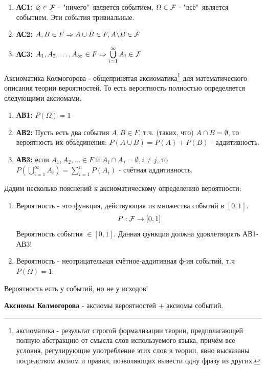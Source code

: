 \begin{axioms}\leavevmode \vspace*{-\bigskipamount}\vspace*{-\medskipamount}
	\begin{enumerate}
		\item \textbf{АС1:} $\varnothing \in {\mathcal F}$ - "ничего"\ является событием, $\Omega \in {\mathcal F}$ - "всё"\ является событием. Эти события тривиальные.
		\item \textbf{АС2:} $A, B \in F \Rightarrow A \cup B \in F, A \backslash B \in {\mathcal F}$
		\item \textbf{АС3:} $A_1, A_2, \dots, A_\infty \in F \Rightarrow \bigcup\limits_{i=1}^{\infty} A_i \in {\mathcal F}$
	\end{enumerate}
\end{axioms}

\begin{definition}
	Аксиоматика Колмогорова - общепринятая аксиоматика\footnote{аксиоматика - результат строгой формализации теории, предполагающей полную абстракцию от смысла слов используемого языка, причём все условия, регулирующие употребление этих слов в теории, явно высказаны посредством аксиом и правил, позволяющих вывести одну фразу из других.} для математического описания теории вероятностей. То есть вероятность полностью определяется следующими аксиомами.
	\begin{axioms}[вероятности]\leavevmode \vspace*{-\bigskipamount}\vspace*{-\medskipamount}
		\begin{enumerate}
			\item \textbf{АВ1:} $P(\Omega) = 1$
			\item \textbf{АВ2:} Пусть есть два события $A, B \in F$, т.ч. (таких, что) $A \cap B = \emptyset$, то вероятность их объединения: $P(A \cup B) = P(A) + P(B)$ - аддитивность.
			\item \textbf{АВ3:} если $A_1, A_2, \dots \in F \text{ и } A_i \cap A_j = \emptyset, i \ne j$, то $P \left(\bigcup\limits_{i=1}^{\infty}A_i \right) = \sum\limits_{i=1}^{n}P(A_i)$ - счётная аддитивность.
		\end{enumerate}
	\end{axioms}
\end{definition}

Дадим несколько пояснений к аксиоматическому определению вероятности:
\begin{enumerate}
	\item Вероятность - это функция, действующая из множества событий в $[0,1]$.
	\[ P: {\mathcal F} \to [0,1] \]
	Вероятность события $\in [0,1]$. Данная функция должна удовлетворять АВ1-АВ3!
	\item Вероятность - неотрицательная счётное-аддитивная ф-ия событий, т.ч $P(\Omega) = 1$.
\end{enumerate}
\begin{remark}
	Вероятность есть у событий, но не у исходов!
\end{remark}
\begin{remark}
	\textbf{Аксиомы Колмогорова} - аксиомы вероятностей + аксиомы событий.
\end{remark}

